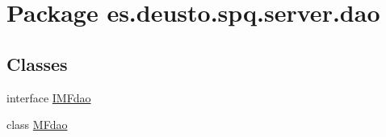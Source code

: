 \hypertarget{namespacees_1_1deusto_1_1spq_1_1server_1_1dao}{}\section{Package es.\+deusto.\+spq.\+server.\+dao}
\label{namespacees_1_1deusto_1_1spq_1_1server_1_1dao}
\subsection*{Classes}
\begin{DoxyCompactItemize}
\item 
interface \hyperlink{interfacees_1_1deusto_1_1spq_1_1server_1_1dao_1_1_i_m_fdao}{I\+M\+Fdao}
\item 
class \hyperlink{classes_1_1deusto_1_1spq_1_1server_1_1dao_1_1_m_fdao}{M\+Fdao}
\end{DoxyCompactItemize}
